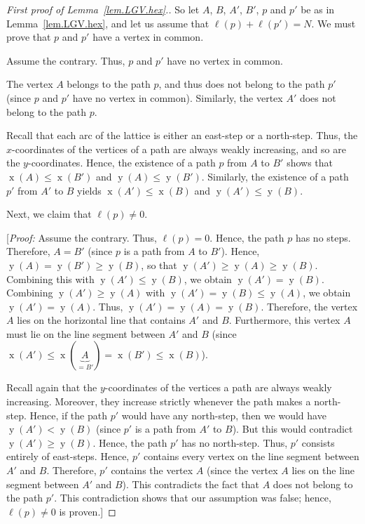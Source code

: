 \documentclass[reqno]{amsart}
\newcommand{\0}{\phantom{c}}
\DeclareMathOperator{\xcoord}{x} %
\DeclareMathOperator{\ycoord}{y} %
\newenvironment{verlong}{}{}
\theoremstyle{plain}
\theoremstyle{definition}
\numberwithin{equation}{section}
\begin{document}
\begin{verlong}
\begin{proof}[First proof of Lemma~\ref{lem.LGV.hex}.]
So let $A$, $B$, $A'$, $B'$, $p$ and $p'$ be as in Lemma~\ref{lem.LGV.hex}, and let us assume that $\ell(p) + \ell(p') = N$.
We must prove that $p$ and $p'$ have a vertex in common.

Assume the contrary. Thus, $p$ and $p'$ have no vertex in common.

The vertex $A$ belongs to the path $p$, and thus does not belong to the path
$p'$ (since $p$ and $p'$ have no vertex in common). Similarly,
the vertex $A'$ does not belong to the path $p$.

Recall that each arc of the lattice is either an east-step or a north-step.
Thus, the $x$-coordinates of the vertices of a path are always weakly
increasing, and so are the $y$-coordinates. Hence, the existence of a path $p$
from $A$ to $B'$ shows that $\xcoord\left(  A\right)
\leq\xcoord\left(  B'\right)  $ and
$\ycoord\left(  A\right)  \leq\ycoord\left(  B'\right)  $.
Similarly, the existence of a path $p'$ from $A'$ to $B$ yields
$\xcoord\left(  A'\right)  \leq\xcoord\left(  B\right)  $ and
$\ycoord\left(  A'\right)  \leq\ycoord\left(  B\right)  $.

Next, we claim that $\ell\left(  p\right)  \neq0$.

[\textit{Proof:} Assume the contrary. Thus, $\ell\left(  p\right)  =0$. Hence,
the path $p$ has no steps. Therefore, $A=B'$ (since $p$ is a path from
$A$ to $B'$). Hence, $\ycoord\left(  A\right)
=\ycoord\left(  B'\right)  \geq\ycoord\left(
B\right)  $, so that $\ycoord\left(  A'\right)
\geq\ycoord\left(  A\right)  \geq\ycoord\left(  B\right)
$. Combining this with $\ycoord\left(  A'\right)
\leq\ycoord\left(  B\right)  $, we obtain $\ycoord\left(
A'\right)  =\ycoord\left(  B\right)  $. Combining
$\ycoord\left(  A'\right)  \geq\ycoord\left(
A\right)  $ with $\ycoord\left(  A'\right)
=\ycoord\left(  B\right)  \leq\ycoord\left(  A\right)  $,
we obtain $\ycoord\left(  A'\right)  =\ycoord\left(  A\right)  $.
Thus, $\ycoord\left(  A'\right)
=\ycoord\left(  A\right)  =\ycoord\left(  B\right)  $.
Therefore, the vertex $A$ lies on the horizontal line that contains
$A'$ and $B$. Furthermore, this vertex $A$ must lie on the line
segment between $A'$ and $B$ (since $\xcoord\left(
A'\right)  \leq\xcoord\left(  \underbrace{A}_{=B'}\right)
=\xcoord\left(  B'\right)  \leq\xcoord\left(  B\right)  $).

Recall again that the $y$-coordinates of the vertices a path are always weakly
increasing. Moreover, they increase strictly whenever the path makes a
north-step. Hence, if the path $p'$ would have any north-step, then we
would have $\ycoord\left(  A'\right)  <\ycoord\left(  B\right)  $
(since $p'$ is a path from $A'$ to $B$).
But this would contradict $\ycoord\left(  A'\right)
\geq\ycoord\left(  B\right)  $. Hence, the path $p'$ has no
north-step. Thus, $p'$ consists entirely of east-steps. Hence,
$p'$ contains every vertex on the line segment between $A'$
and $B$. Therefore, $p'$ contains the vertex $A$ (since the vertex $A$
lies on the line segment between $A'$ and $B$). This contradicts the
fact that $A$ does not belong to the path $p'$. This contradiction
shows that our assumption was false; hence, $\ell\left(  p\right)  \neq0$ is proven.]


\end{proof}
\end{verlong}
\end{document}
